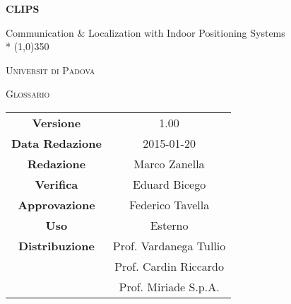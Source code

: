 \documentclass[a4paper]{article}
\author{Zanella Marco}
\date{07/12/2015}
\begin{document}
\begin{titlepage}
	\centering
	{\huge\bfseries CLIPS\par}
	Communication \& Localization with Indoor Positioning Systems \\*
	\line(1,0){350} \\
	{\scshape\LARGE Universit di Padova \par}
	\vspace{1cm}
	{\scshape\Large Glossario \par}
	\logo
	\newpage
		\begin{tabular}{c|c}
			{\hfill \textbf{Versione}} 			& 1.00			\\[1ex]
			{\hfill\textbf{Data Redazione}} 	& 2015-01-20  \\[1ex]
			{\hfill\textbf{Redazione}} 			&  Marco Zanella      \\[1ex]
			{\hfill\textbf{Verifica}} 			&  Eduard Bicego	\\[1ex]
			{\hfill\textbf{Approvazione}} 		&  Federico Tavella	\\[1ex] 
			{\hfill\textbf{Uso}} 				& Esterno		\\[1ex]
			{\hfill\textbf{Distribuzione}} 		& Prof. Vardanega Tullio	\\[1ex]
                                                    & Prof. Cardin Riccardo	\\[1ex]
                                                    & Prof. Miriade S.p.A.	\\[1ex]
		\end{tabular}
	\end{titlepage}
	

	
	\pagestyle{mymain}
	\glsaddall
	\printglossary[style=myaltlistgroup, nonumberlist]

\label{LastPage}
\end{document}
